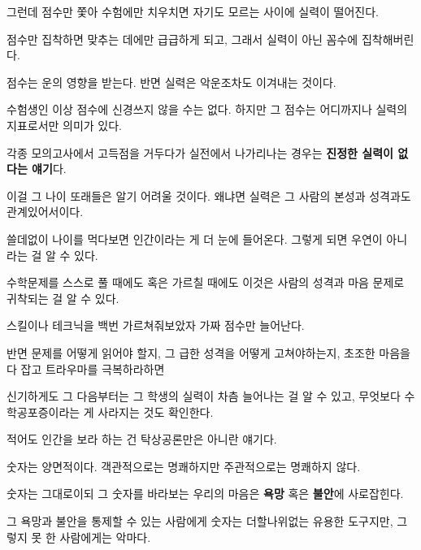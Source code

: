 그런데 점수만 쫓아 수험에만 치우치면 자기도 모르는 사이에 실력이 떨어진다.
\vspace{5mm}

점수만 집착하면 맞추는 데에만 급급하게 되고, 그래서 실력이 아닌 꼼수에 집착해버린다.
\vspace{5mm}

점수는 운의 영향을 받는다. 반면 실력은 악운조차도 이겨내는 것이다.
\vspace{5mm}

수험생인 이상 점수에 신경쓰지 않을 수는 없다. 하지만 그 점수는 어디까지나 실력의 지표로서만 의미가 있다.
\vspace{5mm}

각종 모의고사에서 고득점을 거두다가 실전에서 나가리나는 경우는 \textbf{진정한 실력이 없다는 얘기}다.
\vspace{5mm}

이걸 그 나이 또래들은 알기 어려울 것이다. 왜냐면 실력은 그 사람의 본성과 성격과도 관계있어서이다.
\vspace{5mm}

쓸데없이 나이를 먹다보면 인간이라는 게 더 눈에 들어온다. 그렇게 되면 우연이 아니라는 걸 알 수 있다.
\vspace{5mm}

수학문제를 스스로 풀 때에도 혹은 가르칠 때에도 이것은 사람의 성격과 마음 문제로 귀착되는 걸 알 수 있다.
\vspace{5mm}

스킬이나 테크닉을 백번 가르쳐줘보았자 가짜 점수만 늘어난다.
\vspace{5mm}

반면 문제를 어떻게 읽어야 할지, 그 급한 성격을 어떻게 고쳐야하는지, 초조한 마음을 다 잡고 트라우마를 극복하라하면
\vspace{5mm}

신기하게도 그 다음부터는 그 학생의 실력이 차츰 늘어나는 걸 알 수 있고, 무엇보다 수학공포증이라는 게 사라지는 것도 확인한다.
\vspace{5mm}

적어도 인간을 보라 하는 건 탁상공론만은 아니란 얘기다.
\vspace{5mm}

숫자는 양면적이다. 객관적으로는 명쾌하지만 주관적으로는 명쾌하지 않다.
\vspace{5mm}

숫자는 그대로이되 그 숫자를 바라보는 우리의 마음은 \textbf{욕망} 혹은 \textbf{불안}에 사로잡힌다.
\vspace{5mm}

그 욕망과 불안을 통제할 수 있는 사람에게 숫자는 더할나위없는 유용한 도구지만, 그렇지 못 한 사람에게는 악마다.
\vspace{5mm}

